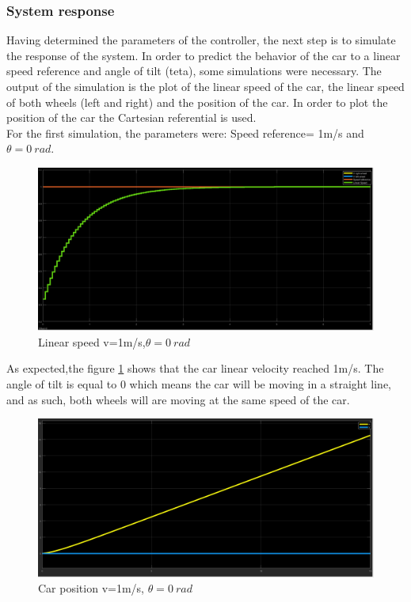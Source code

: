 \subsubsection{System response}
Having determined the parameters of the controller, the next step is to simulate the response of the system.
In order to predict the behavior of the car to a linear speed reference and angle of tilt (teta), some simulations were necessary. The output of the simulation is the plot of the linear speed of the car, the linear speed of both wheels (left and right) and the position of the car.
In order to plot the position of the car the Cartesian referential is used.\\
For the first simulation, the parameters were: Speed reference= 1m/s and $\theta = 0~\si{rad}$.\\
\begin{figure}[!h]
\centering
\includegraphics[width=1.0\textwidth]{./img/vel10.png}
\caption {\label{fig:sim1 - vel}Linear speed v=1m/s,$\theta = 0~\si{rad}$}
\end{figure}
 As expected,the figure \ref{fig:sim1 - vel} shows that the car linear velocity reached 1m/s. The angle of tilt is equal to 0 which means the car will be moving in a straight line, and as such, both wheels will are moving at the same speed of the car.\\
\newpage
\begin{figure}[!h]
\centering
\includegraphics[width=1.0\textwidth]{./img/xy10.png}
\caption {\label{fig:sim1 - pos}Car position v=1m/s, $\theta = 0~\si{rad}$}
\end{figure}
